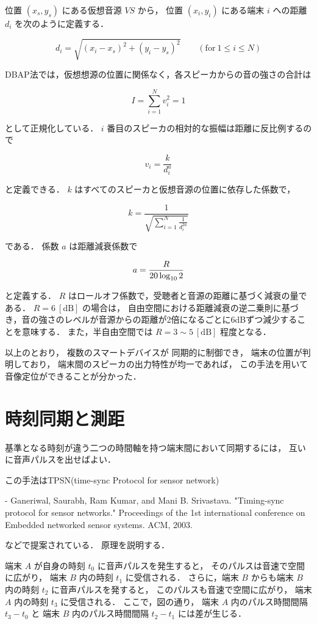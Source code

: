 位置 $(x_s,y_s)$ にある仮想音源 $VS$ から，
位置 $(x_i,y_i)$ にある端末 $i$ への距離 $d_i$ を次のように定義する．


$$
d_i = \sqrt{(x_i - x_s)^2 + (y_i - y_s)^2} \qquad (\mathrm{for}\ 1 \leq i \leq N)
$$

DBAP法では，仮想想源の位置に関係なく，各スピーカからの音の強さの合計は

$$
I = \sum_{i=1}^N v_i^2 = 1
$$

として正規化している．
$i$ 番目のスピーカの相対的な振幅は距離に反比例するので

$$
v_i = \frac{k}{d_i^a}
$$

と定義できる．
$k$ はすべてのスピーカと仮想音源の位置に依存した係数で，

$$
k = \frac{1}{\sqrt{\sum_{i=1}^N \frac{1}{d_i^{2a}}}}
$$

である．
係数 $a$ は距離減衰係数で

$$
a = \frac{R}{20 \log_{10}2} \\
$$

と定義する．
$R$ はロールオフ係数で，受聴者と音源の距離に基づく減衰の量である．
$R=6\ [\mathrm{dB}]$ の場合は，
自由空間における距離減衰の逆二乗則に基づき，音の強さのレベルが音源からの距離が2倍になるごとに6dBずつ減少することを意味する．
また，半自由空間では $R=3\sim5\ [\mathrm{dB}]$ 程度となる．

以上のとおり，
複数のスマートデバイスが
同期的に制御でき，
端末の位置が判明しており，
端末間のスピーカの出力特性が均一であれば，
この手法を用いて音像定位ができることが分かった．

\section{時刻同期と測距}

基準となる時刻が違う二つの時間軸を持つ端末間において同期するには，
互いに音声パルスを出せばよい．


この手法はTPSN(time-sync Protocol for sensor network)

- Ganeriwal, Saurabh, Ram Kumar, and Mani B. Srivastava. "Timing-sync protocol for sensor networks." Proceedings of the 1st international conference on Embedded networked sensor systems. ACM, 2003.

などで提案されている．
原理を説明する．

端末 $A$ が自身の時刻 $t_0$ に音声パルスを発生すると，
そのパルスは音速で空間に広がり，
端末 $B$ 内の時刻 $t_1$ に受信される．
さらに，端末 $B$ からも端末 $B$ 内の時刻 $t_2$ に音声パルスを発すると，
このパルスも音速で空間に広がり，
端末 $A$ 内の時刻 $t_3$ に受信される．
ここで，図の通り，
端末 $A$ 内のパルス時間間隔 $t_3-t_0$ と
端末 $B$ 内のパルス時間間隔 $t_2-t_1$ には差が生じる．


